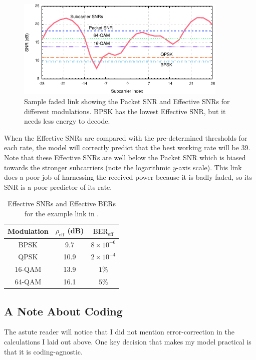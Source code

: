 \begin{figure}[t]
  \centering
  \includegraphics[width=0.9\textwidth]{figures/eff_snr_example.pdf}
  \caption[Packet SNR and Effective SNRs for a sample faded link]{Sample faded link showing the Packet SNR and Effective SNRs for different modulations. BPSK has the lowest Effective SNR, but it needs less energy to decode.}
  \label{fig:eff_example}
\end{figure}

When the Effective SNRs are compared with the pre-determined thresholds for each rate, the model will correctly predict that the best working rate will be 39\Mbps. Note that these Effective SNRs are well below the Packet SNR which is biased towards the stronger subcarriers (note the logarithmic $y$-axis scale). This link does a poor job of harnessing the received power because it is badly faded, so its SNR is a poor predictor of its rate.

\begin{table}[t]
	\centering
	\begin{tabular}{ccc}
	\toprule%
	Modulation & $\rho_\text{eff}$ (dB) & $\text{BER}_\text{eff}$\\
	\midrule%
	BPSK   &  9.7 & $8\times10^{-6}$\\
	QPSK   & 10.9 & $2\times10^{-4}$\\
	16-QAM & 13.9 & $1\%$\\
	64-QAM & 16.1 & $5\%$\\
	\bottomrule
	\end{tabular}
	\caption[Effective SNRs and Effective BERs for the example link in ]{\label{tab:example_bers}Effective SNRs and Effective BERs for the example link in .}
\end{table}

\subsection{A Note About Coding}
The astute reader will notice that I did not mention error-correction in the calculations I laid out above. One key decision that makes my model practical is that it is coding-agnostic.

